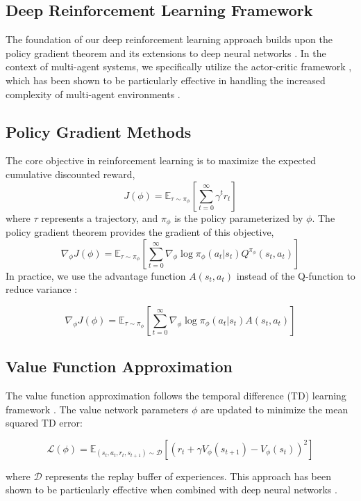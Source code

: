 \subsection*{Deep Reinforcement Learning Framework}

The foundation of our deep reinforcement learning approach builds upon the policy gradient theorem \citep{sutton2000policy} and its extensions to deep neural networks \citep{mnih2015human}. In the context of multi-agent systems, we specifically utilize the actor-critic framework \citep{konda2000actor}, which has been shown to be particularly effective in handling the increased complexity of multi-agent environments \citep{lowe2017multi}.

\subsection*{Policy Gradient Methods}

The core objective in reinforcement learning is to maximize the expected cumulative discounted reward,
\[
J(\phi) = \mathbb{E}_{\tau \sim \pi_\phi}[\sum_{t=0}^{\infty} \gamma^t r_t]
\]
where $\tau$ represents a trajectory, and $\pi_\phi$ is the policy parameterized by $\phi$. The policy gradient theorem \citep{sutton2000policy} provides the gradient of this objective,
\[
\nabla_\phi J(\phi) = \mathbb{E}_{\tau \sim \pi_\phi}[\sum_{t=0}^{\infty} \nabla_\phi \log \pi_\phi(a_t|s_t) Q^{\pi_\phi}(s_t, a_t)]
\]
In practice, we use the advantage function $A(s_t, a_t)$ instead of the Q-function to reduce variance \citep{schulman2015high}:

\[
\nabla_\phi J(\phi) = \mathbb{E}_{\tau \sim \pi_\phi}[\sum_{t=0}^{\infty} \nabla_\phi \log \pi_\phi(a_t|s_t) A(s_t, a_t)]
\]

\subsection*{Value Function Approximation}
The value function approximation follows the temporal difference (TD) learning framework \citep{sutton2018reinforcement}. The value network parameters $\phi$ are updated to minimize the mean squared TD error:

\[
\mathcal{L}(\phi) = \mathbb{E}_{(s_t, a_t, r_t, s_{t+1}) \sim \mathcal{D}}[(r_t + \gamma V_\phi(s_{t+1}) - V_\phi(s_t))^2]
\]

where $\mathcal{D}$ represents the replay buffer of experiences. This approach has been shown to be particularly effective when combined with deep neural networks \citep{mnih2015human}.

